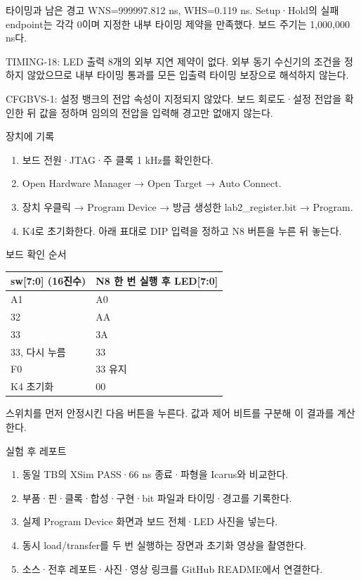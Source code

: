 \begin{frame}{타이밍과 남은 경고}
\small
WNS=999997.812 ns, WHS=0.119 ns. Setup·Hold의 실패 endpoint는 각각 0이며 지정한 내부 타이밍 제약을 만족했다. 보드 주기는 1,000,000 ns다.\par\vspace{0.26cm}TIMING-18: LED 출력 8개의 외부 지연 제약이 없다. 외부 동기 수신기의 조건을 정하지 않았으므로 내부 타이밍 통과를 모든 입출력 타이밍 보장으로 해석하지 않는다.\par\vspace{0.26cm}CFGBVS-1: 설정 뱅크의 전압 속성이 지정되지 않았다. 보드 회로도·설정 전압을 확인한 뒤 값을 정하며 임의의 전압을 입력해 경고만 없애지 않는다.\par
\end{frame}

\begin{frame}{장치에 기록}
\small
\begin{enumerate}
\item 보드 전원·JTAG·주 클록 1 kHz를 확인한다.
\item Open Hardware Manager → Open Target → Auto Connect.
\item 장치 우클릭 → Program Device → 방금 생성한 lab2\_register.bit → Program.
\item K4로 초기화한다. 아래 표대로 DIP 입력을 정하고 N8 버튼을 누른 뒤 놓는다.
\end{enumerate}
\end{frame}

\begin{frame}{보드 확인 순서}
\small
\begin{center}\renewcommand{\arraystretch}{1.55}\begin{tabular}{ll}
sw[7:0] (16진수) & N8 한 번 실행 후 LED[7:0]\\\hline
A1 & A0\\
32 & AA\\
33 & 3A\\
33, 다시 누름 & 33\\
F0 & 33 유지\\
K4 초기화 & 00\\
\end{tabular}\end{center}스위치를 먼저 안정시킨 다음 버튼을 누른다. 값과 제어 비트를 구분해 이 결과를 계산한다.\par
\end{frame}

\begin{frame}[label=after-report]{실험 후 레포트}
\small
\begin{enumerate}
\item 동일 TB의 XSim PASS·66 ns 종료·파형을 Icarus와 비교한다.
\item 부품·핀·클록·합성·구현·bit 파일과 타이밍·경고를 기록한다.
\item 실제 Program Device 화면과 보드 전체·LED 사진을 넣는다.
\item 동시 load/transfer를 두 번 실행하는 장면과 초기화 영상을 촬영한다.
\item 소스·전후 레포트·사진·영상 링크를 GitHub README에서 연결한다.
\end{enumerate}
\end{frame}

